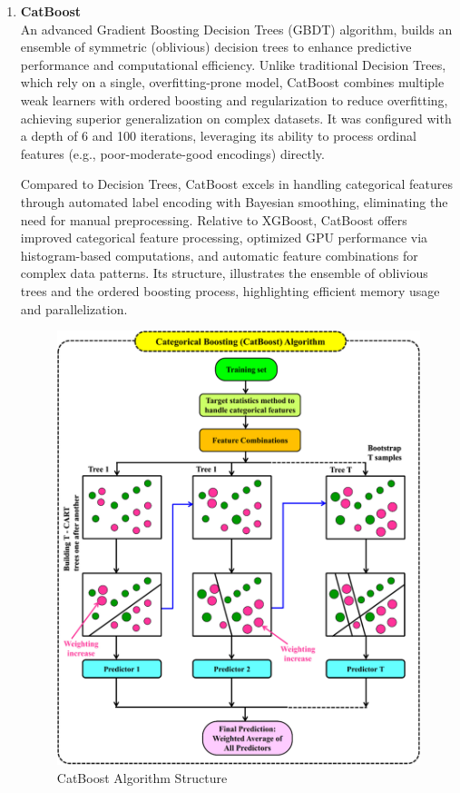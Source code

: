 \documentclass[conference]{IEEEtran}
\begin{document}
\begin{enumerate}
    \item \textbf{CatBoost} \\
    An advanced Gradient Boosting Decision Trees (GBDT) algorithm, builds an ensemble of symmetric (oblivious) decision trees to enhance predictive performance and computational efficiency. Unlike traditional Decision Trees, which rely on a single, overfitting-prone model, CatBoost combines multiple weak learners with ordered boosting and regularization to reduce overfitting, achieving superior generalization on complex datasets. It was configured with a depth of 6 and 100 iterations, leveraging its ability to process ordinal features (e.g., poor-moderate-good encodings) directly.

    Compared to Decision Trees, CatBoost excels in handling categorical features through automated label encoding with Bayesian smoothing, eliminating the need for manual preprocessing. Relative to XGBoost, CatBoost offers improved categorical feature processing, optimized GPU performance via histogram-based computations, and automatic feature combinations for complex data patterns. Its structure, illustrates the ensemble of oblivious trees and the ordered boosting process, highlighting efficient memory usage and parallelization.

    \begin{figure}[H]
    \centering
    \includegraphics[width=0.9\linewidth]{images/Catboost.png}
    \caption{CatBoost Algorithm Structure}
    \label{fig:catboost-structure}
    \end{figure}
    

\end{enumerate}
\end{document}
